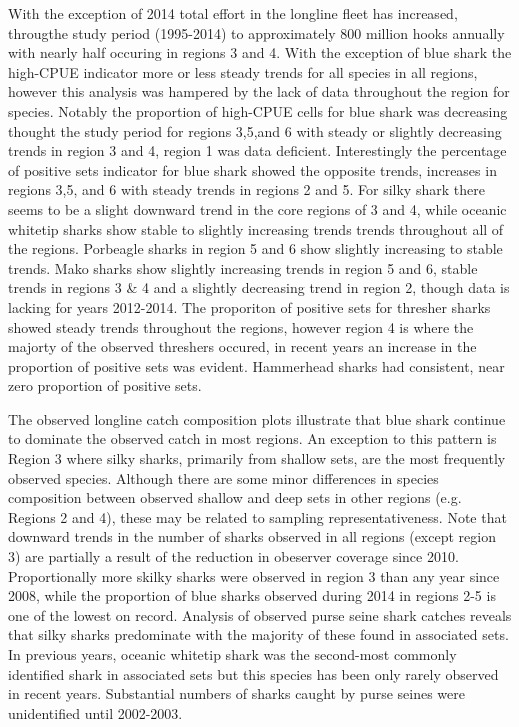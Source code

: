 \documentclass[12pt]{SCreport}
\begin{document}
{%
With the exception of 2014 total effort in the longline fleet has increased, througthe study  period (1995-2014) to approximately 800 million hooks annually with nearly half occuring in regions 3 and 4.  With the exception of blue shark the high-CPUE indicator more or less steady trends for all species in all regions, however this analysis was hampered by the lack of data throughout the region for species.  Notably the proportion of high-CPUE cells for blue shark was decreasing thought the study period for regions 3,5,and 6 with steady or slightly decreasing trends in region 3 and 4, region 1 was data deficient. 
Interestingly  the   percentage of positive sets  indicator for blue shark showed the opposite trends, increases in regions 3,5, and 6 with steady trends in regions 2 and 5. 
For silky shark there seems to be a slight downward trend in the core regions of 3 and 4, while oceanic whitetip sharks show stable to  slightly increasing trends trends throughout all of the regions.  
Porbeagle sharks in region 5 and 6 show slightly increasing to stable trends. 
Mako sharks show slightly increasing trends in region 5 and 6, stable trends in regions 3 \& 4 and a slightly decreasing trend in region 2, though data is lacking for years 2012-2014.  The proporiton of positive sets for thresher sharks showed steady trends throughout the regions, however region 4 is where the majorty of the observed threshers occured, in recent years an increase in the proportion of positive sets was evident. 
Hammerhead sharks had consistent, near zero proportion of positive sets. 

The observed longline catch composition plots illustrate that blue shark continue to dominate the observed catch in most regions. An exception to this pattern is Region 3 where silky sharks, primarily from shallow sets, are the most frequently observed species. Although there are some minor differences in species composition between observed shallow and deep sets in other regions (e.g. Regions 2 and 4), these may be related to sampling representativeness. Note that   downward trends in the number of sharks observed in all regions (except region 3) are partially a result of the reduction in obeserver coverage since 2010.   Proportionally more skilky sharks were observed in region 3 than any year since 2008, while the proportion of blue sharks observed during 2014 in regions 2-5 is one of the lowest on record. Analysis of observed purse seine shark catches reveals that silky sharks predominate with the majority of these found in associated sets. In previous years, oceanic whitetip shark was the second-most commonly identified shark in associated sets but this species has been only rarely observed in recent years. Substantial numbers of sharks caught by purse seines were unidentified until 2002-2003. 
}
\end{document}
